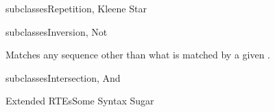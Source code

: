 \newsavebox\notbox
\begin{lrbox}{\notbox}
  \begin{minipage}{12cm}
    
  \end{minipage}
\end{lrbox}


\begin{frame}{ subclasses}{Repetition, Kleene Star}
  \usebox\starbox
\end{frame}

\begin{frame}{ subclasses}{Inversion, Not}
  \usebox\notbox

  Matches any sequence other than what is matched by a given .
\end{frame}

\begin{frame}{ subclasses}{Intersection, And}
  \usebox\andbox
 \end{frame}


\newsavebox\extendedbox
\begin{lrbox}{\extendedbox}
  \begin{minipage}{12cm}
  
  \end{minipage}
\end{lrbox}

\begin{frame}{Extended RTEs}{Some Syntax Sugar}
  \usebox\extendedbox
\end{frame}





